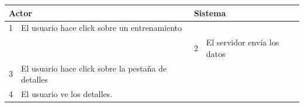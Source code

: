 \begin{itemize}
\begin{itemize}
\begin{table}[H]
\begin{tabularx}{\textwidth}{|l|X|l|X|}
        \multicolumn{2}{|l|}{\cellcolor[HTML]{EFEFEF}Actor} & \multicolumn{2}{l|}{\cellcolor[HTML]{EFEFEF}Sistema} \\ \hline
        1                         & El usuario hace click sobre un entrenamiento                       &                            &                         \\ \hline
                                  &                         & 2                          & El servidor envía los datos                     \\ \hline
        3                        & El usuario hace click sobre la pestaña de detalles      &                          &                        \\ \hline
        4                        & El usuario ve los detalles.      &                          &                        \\ \hline
                                  

\end{tabularx}
\end{table}
\end{itemize}
\end{itemize}
